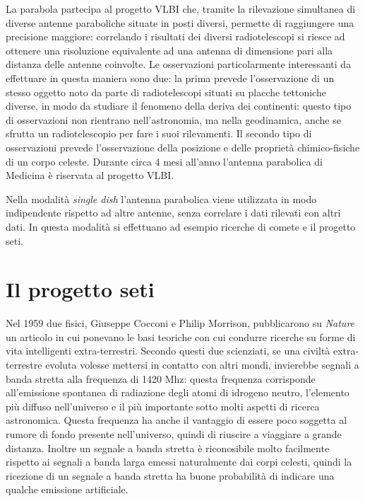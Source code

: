La parabola partecipa al progetto \ac{VLBI} che, tramite la rilevazione
simultanea di diverse antenne paraboliche situate in posti diversi, permette di
raggiungere una precisione maggiore: correlando i risultati dei diversi
radiotelescopi si riesce ad ottenere una risoluzione equivalente ad una antenna
di dimensione pari alla distanza delle antenne coinvolte. Le osservazioni
particolarmente interessanti da effettuare in questa maniera sono due: la prima
prevede l'osservazione di un stesso oggetto noto da parte di radiotelescopi
situati su placche tettoniche diverse, in modo da studiare il fenomeno della
deriva dei continenti: questo tipo di osservazioni non rientrano
nell'astronomia, ma nella geodinamica, anche se sfrutta un radiotelescopio per
fare i suoi rilevamenti. Il secondo tipo di osservazioni prevede l'osservazione
della posizione e delle propriet\`a chimico-fisiche di un corpo celeste. Durante
circa 4 mesi all'anno l'antenna parabolica di Medicina \`e riservata al progetto
\ac{VLBI}.

Nella modalit\`a \emph{single dish} l'antenna parabolica viene utilizzata in
modo indipendente rispetto ad altre antenne, senza correlare i dati rilevati con
altri dati. In questa modalit\`a si effettuano ad esempio ricerche di comete e
il progetto \ac{seti}.

\section*{Il progetto \ac{seti}}
Nel 1959 due fisici, Giuseppe Cocconi e Philip Morrison, pubblicarono su
\emph{Nature} un articolo \cite{CMSETI59} in cui ponevano le basi teoriche con cui condurre
ricerche su forme di vita intelligenti extra-terrestri. Secondo questi due
scienziati, se una civilt\`a extra-terrestre evoluta volesse mettersi in
contatto con altri mondi, invierebbe segnali a banda stretta alla frequenza di
1420 Mhz: questa frequenza corrisponde all'emissione spontanea di radiazione
degli atomi di idrogeno neutro, l'elemento pi\`u diffuso nell'universo e il
pi\`u importante sotto molti aspetti di ricerca astronomica. Questa frequenza ha
anche il vantaggio di essere poco soggetta al rumore di fondo presente
nell'universo, quindi di riuscire a viaggiare a grande distanza. Inoltre un
segnale a banda stretta \`e riconosibile molto facilmente rispetto ai segnali a
banda larga emessi naturalmente dai corpi celesti, quindi la ricezione di un
segnale a banda stretta ha buone probabilit\`a di indicare una qualche emissione
artificiale.


